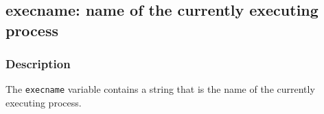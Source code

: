 \clearpage
{}
{}
\label{vars:execname}
\subsection*{execname: name of the currently executing process}

\subsubsection*{Description}

The \verb|execname| variable contains a string that is the name of the
currently executing process.


